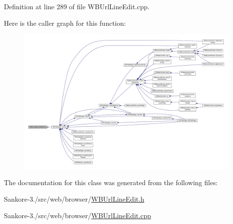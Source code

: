 Definition at line 289 of file W\-B\-Url\-Line\-Edit.\-cpp.



Here is the caller graph for this function\-:
\nopagebreak
\begin{figure}[H]
\begin{center}
\leavevmode
\includegraphics[width=350pt]{d6/d29/class_w_b_url_line_edit_a599a1ac7fe0bd0430e1480e76aebc474_icgraph}
\end{center}
\end{figure}




The documentation for this class was generated from the following files\-:\begin{DoxyCompactItemize}
\item 
Sankore-\/3./src/web/browser/\hyperlink{_w_b_url_line_edit_8h}{W\-B\-Url\-Line\-Edit.\-h}\item 
Sankore-\/3./src/web/browser/\hyperlink{_w_b_url_line_edit_8cpp}{W\-B\-Url\-Line\-Edit.\-cpp}\end{DoxyCompactItemize}
